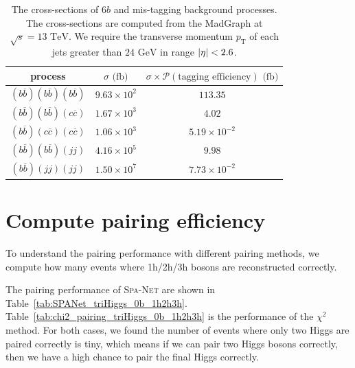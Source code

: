 \documentclass[12pt]{article}
\begin{document}
	\begin{table}[htpb]
		\centering
		\caption{The cross-sections of $6b$ and mis-tagging background processes. The cross-sections are computed from the MadGraph at $\sqrt{s} = 13 \text{ TeV}$. We require the transverse momentum $p_{\text{T}}$ of each jets greater than $\text{24 GeV}$ in range $\abs{\eta} < 2.6$.}
		\label{tab:cross_section_of_mis_tagging_background_w_cuts}
		\begin{tabular}{c|cc}
		process                                         & $\sigma\text{ (fb)}$ & $\sigma\times\mathcal{P}(\text{tagging efficiency})\text{ (fb)}$ \\ \hline
		$(b\overline{b})(b\overline{b})(b\overline{b})$ & $9.63 \times 10^{2}$ & $113.35$                                                         \\
		$(b\overline{b})(b\overline{b})(c\overline{c})$ & $1.67 \times 10^{3}$ & $4.02$                                                           \\
		$(b\overline{b})(c\overline{c})(c\overline{c})$ & $1.06 \times 10^{3}$ & $5.19 \times 10^{-2}$                                            \\
		$(b\overline{b})(b\overline{b})(jj)$            & $4.16 \times 10^{5}$ & $9.98$                                                           \\
		$(b\overline{b})(jj)(jj)$                       & $1.50 \times 10^{7}$ & $7.73 \times 10^{-2}$                                           
		\end{tabular}
	\end{table}
\section{Compute pairing efficiency}%
\label{sec:compute_pairing_efficiency}
	To understand the pairing performance with different pairing methods, we compute how many events where 1h/2h/3h bosons are reconstructed correctly.

	The pairing performance of \textsc{Spa-Net} are shown in Table~\ref{tab:SPANet_triHiggs_0b_1h2h3h}. Table~\ref{tab:chi2_pairing_triHiggs_0b_1h2h3h} is the performance of the $\chi^2$ method. For both cases, we found the number of events where only two Higgs are paired correctly is tiny, which means if we can pair two Higgs bosons correctly, then we have a high chance to pair the final Higgs correctly.
\end{document}
